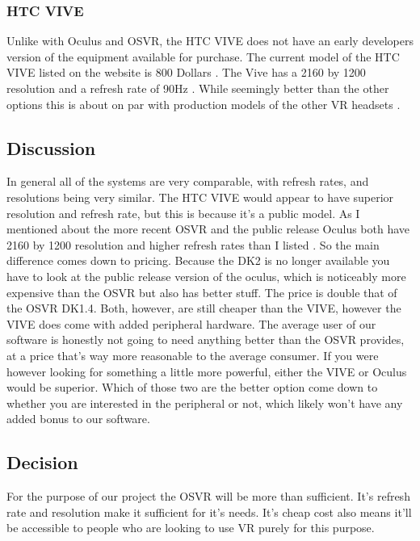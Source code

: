\documentclass{article}
\begin{document}
\subsubsection{HTC VIVE}
Unlike with Oculus and OSVR, the HTC VIVE does not have an early developers version of the equipment available for purchase.
The current model of the HTC VIVE listed on the website is 800 Dollars \cite{vivehardware}.
The Vive has a 2160 by 1200 resolution and a refresh rate of 90Hz \cite{vivehardware}.
While seemingly better than the other options this is about on par with production models of the other VR headsets \cite{osvrhardware}\cite{oculushardware}.

\subsection{Discussion}
In general all of the systems are very comparable, with refresh rates, and resolutions being very similar.
The HTC VIVE would appear to have superior resolution and refresh rate, but this is because it's a public model.
As I mentioned  about the more recent OSVR and the public release Oculus both have 2160 by 1200 resolution and higher refresh rates than I listed \cite{oculushardware}\cite{osvrhardware}.
So the main difference comes down to pricing.
Because the DK2 is no longer available you have to look at the public release version of the oculus, which is noticeably more expensive than the OSVR but also has better stuff.
The price is double that of the OSVR DK1.4.
Both, however, are still cheaper than the VIVE, however the VIVE does come with added peripheral hardware.
The average user of our software is honestly not going to need anything better than the OSVR provides, at a price that's way more reasonable to the average consumer.
If you were however looking for something a little more powerful, either the VIVE or Oculus would be superior.
Which of those two are the better option come down to whether you are interested in the peripheral or not, which likely won't have any added bonus to our software.

\subsection{Decision}
For the purpose of our project the OSVR will be more than sufficient.
It's refresh rate and resolution make it sufficient for it's needs.
It's cheap cost also means it'll be accessible to people who are looking to use VR purely for this purpose.
\end{document}
